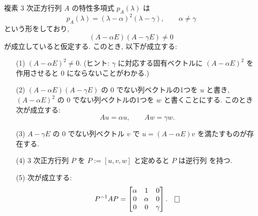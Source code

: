 \documentclass[12pt,twoside]{jarticle}
\begin{document}
\begin{question}[15点]
  \label{q:normal-form-3.2}
  複素 $3$ 次正方行列 $A$ の特性多項式 $p_A(\lambda)$ は
  \begin{equation*}
    p_A(\lambda) = (\lambda - \alpha)^2 (\lambda - \gamma),
    \qquad \alpha \ne \gamma
  \end{equation*}
  という形をしており,
  \begin{equation*}
    (A - \alpha E)(A - \gamma E)\ne 0
  \end{equation*}
  が成立していると仮定する.  このとき, 以下が成立する:
  \begin{enumerate}
  \item[(1)] $(A - \alpha E)^2 \ne 0$.
    (ヒント: $\gamma$ に対応する固有ベクトルに $(A - \alpha E)^2$ 
    を作用させると $0$ にならないことがわかる.)
  \item[(2)] 
    $(A - \alpha E)(A - \gamma E)$ の $0$ でない列ベクトルの1つを $u$ と書き,
    $(A - \alpha E)^2$ の $0$ でない列ベクトルの1つを $w$ と書くことにする. 
    このとき次が成立する:
    \begin{equation*}
      Au = \alpha u,  \qquad Aw = \gamma w.
    \end{equation*}
  \item[(3)] $A - \gamma E$ の $0$ でない列ベクトル $v$ 
    で $u = (A - \alpha E)v$ を満たすものが存在する.
  \item[(4)] $3$ 次正方行列 $P$ を $P := [u, v, w]$ と定めると $P$ は逆行列
    を持つ. 
  \item[(5)] 次が成立する:
    \begin{equation*}
      P^{-1} A P 
      = 
      \begin{bmatrix}
        \alpha & 1 & 0 \\
        0 & \alpha & 0 \\
        0 & 0 & \gamma \\
      \end{bmatrix}.
      \qed
    \end{equation*}
  \end{enumerate}
\end{question}

\end{document}
